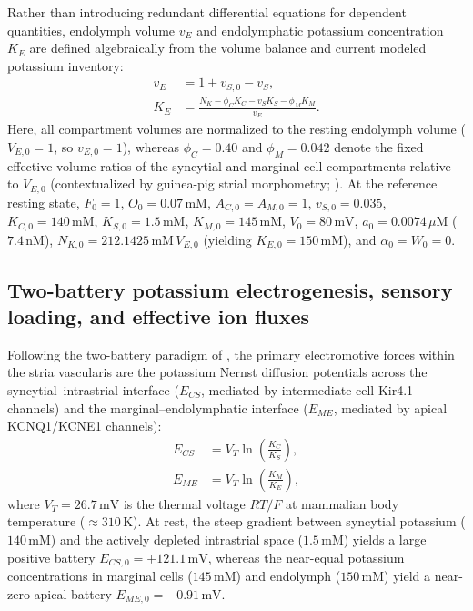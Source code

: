 \documentclass[final,5p,times]{elsarticle}
\begin{document}
Rather than introducing redundant differential equations for dependent quantities, endolymph volume \(v_E\) and endolymphatic potassium concentration \(K_E\) are defined algebraically from the volume balance and current modeled potassium inventory:
\begin{equation}
  \begin{aligned}
    v_E &= 1 + v_{S,0} - v_S,\\
    K_E &= \frac{N_K - \phi_C K_C - v_S K_S - \phi_M K_M}{v_E}.
  \end{aligned}
  \label{eq:endolymph}
\end{equation}
Here, all compartment volumes are normalized to the resting endolymph volume (\(V_{E,0} = 1\), so \(v_{E,0} = 1\)), whereas \(\phi_C = 0.40\) and \(\phi_M = 0.042\) denote the fixed effective volume ratios of the syncytial and marginal-cell compartments relative to \(V_{E,0}\) (contextualized by guinea-pig strial morphometry; \citealt{SantiDuvall1979,Salt2001}). At the reference resting state, \(F_0 = 1\), \(O_0 = 0.07\,\mathrm{mM}\), \(A_{C,0} = A_{M,0} = 1\), \(v_{S,0} = 0.035\), \(K_{C,0} = 140\,\mathrm{mM}\), \(K_{S,0} = 1.5\,\mathrm{mM}\), \(K_{M,0} = 145\,\mathrm{mM}\), \(V_0 = 80\,\mathrm{mV}\), \(a_0 = 0.0074\,\mu\mathrm{M}\) (\(7.4\,\mathrm{nM}\)), \(N_{K,0} = 212.1425\,\mathrm{mM}\,V_{E,0}\) (yielding \(K_{E,0} = 150\,\mathrm{mM}\)), and \(\alpha_0 = W_0 = 0\).



\subsection{Two-battery potassium electrogenesis, sensory loading, and effective ion fluxes}\label{sec:formulation-electrogenesis}

Following the two-battery paradigm of \citet{Nin2008,Nin2012}, the primary electromotive forces within the stria vascularis are the potassium Nernst diffusion potentials across the syncytial--intrastrial interface (\(E_{CS}\), mediated by intermediate-cell Kir4.1 channels) and the marginal--endolymphatic interface (\(E_{ME}\), mediated by apical KCNQ1/KCNE1 channels):
\begin{equation}
  \begin{aligned}
    E_{CS} &= V_T \ln\left(\frac{K_C}{K_S}\right),\\
    E_{ME} &= V_T \ln\left(\frac{K_M}{K_E}\right),
  \end{aligned}
  \label{eq:nernst}
\end{equation}
where \(V_T = 26.7\,\mathrm{mV}\) is the thermal voltage \(RT/F\) at mammalian body temperature (\(\approx 310\,\mathrm{K}\)). At rest, the steep gradient between syncytial potassium (\(140\,\mathrm{mM}\)) and the actively depleted intrastrial space (\(1.5\,\mathrm{mM}\)) yields a large positive battery \(E_{CS,0} = +121.1\,\mathrm{mV}\), whereas the near-equal potassium concentrations in marginal cells (\(145\,\mathrm{mM}\)) and endolymph (\(150\,\mathrm{mM}\)) yield a near-zero apical battery \(E_{ME,0} = -0.91\,\mathrm{mV}\).
\end{document}

